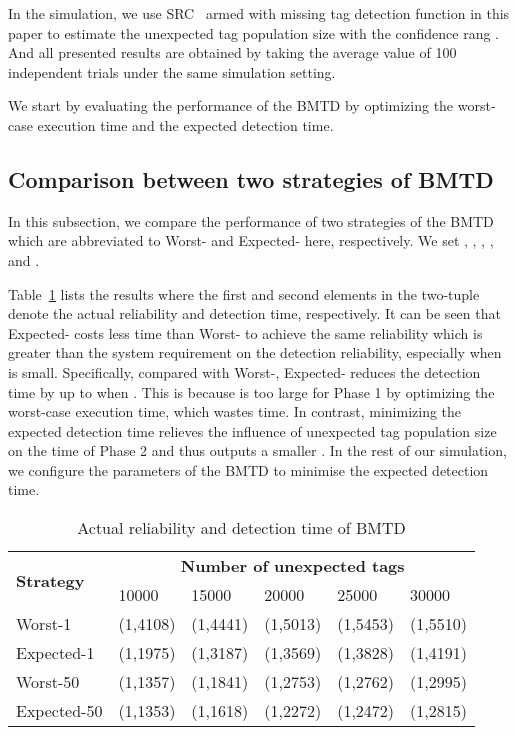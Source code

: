 \documentclass[10pt, twocolumn]{IEEEtran}
\begin{document}
In the simulation, we use SRC~\cite{chen2013understanding} armed with missing tag detection function in this paper to estimate the unexpected tag population size with the confidence rang . And all presented results are obtained by taking the average value of 100 independent trials under the same simulation setting.

We start by evaluating the performance of the BMTD by optimizing the worst-case execution time and the expected detection time.

\subsection{Comparison between two strategies of BMTD}

In this subsection, we compare the performance of two strategies of the BMTD which are abbreviated to Worst- and Expected- here, respectively. We set , , , ,  and .

Table~\ref{Tab:worst_exp} lists the results where the first and second elements in the two-tuple  denote the actual reliability and detection time, respectively. It can be seen that Expected- costs less time than Worst- to achieve the same reliability which is greater than the system requirement on the detection reliability, especially when  is small. Specifically, compared with Worst-, Expected- reduces the detection time by up to  when . This is because  is  too large for Phase 1 by optimizing the worst-case execution time, which wastes time. In contrast, minimizing the expected detection time relieves the influence of unexpected tag population size on the time of Phase 2 and thus outputs a smaller .
In the rest of our simulation, we configure the parameters of the BMTD to minimise the expected detection time. 
\begin{table}[!htbp]
\centering
\caption{Actual reliability and detection time of BMTD}
\label{Tab:worst_exp}
\begin{tabular}{|l|l|l|l|l|l|}
\hline
\multirow{2}{*}{\textbf{Strategy}} & \multicolumn{5}{c|}{\textbf{Number of unexpected tags}}\\
\cline{2-6} & 10000 & 15000 &20000&25000&30000\\
\hline
Worst-1& (1,4108)  & (1,4441) & (1,5013) &(1,5453) &(1,5510) \\
\hline
Expected-1& (1,1975) &  (1,3187)  &  (1,3569) &  (1,3828)& (1,4191) \\
\hline
Worst-50& (1,1357)  & (1,1841) & (1,2753) & (1,2762)& (1,2995)\\
\hline
Expected-50& (1,1353) & (1,1618) &  (1,2272) & (1,2472) &(1,2815)  \\
\hline
\end{tabular}
\end{table}
\end{document}
